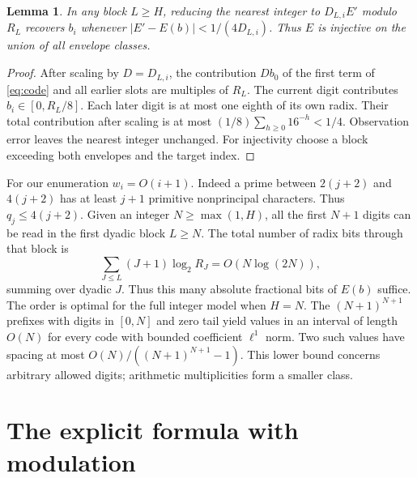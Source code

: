 \documentclass[11pt]{article}
\newtheorem{lemma}[theorem]{Lemma}
\begin{document}
\begin{lemma}\label{l:digits}
In any block $L\ge H$, reducing the nearest integer to $D_{L,i}E'$ modulo $R_L$ recovers $b_i$ whenever $|E'-E(b)|<1/(4D_{L,i})$. Thus $E$ is injective on the union of all envelope classes.
\end{lemma}

\begin{proof}
After scaling by $D=D_{L,i}$, the contribution $D b_0$ of the first term of \eqref{eq:code} and all earlier slots are multiples of $R_L$. The current digit contributes $b_i\in[0,R_L/8]$. Each later digit is at most one eighth of its own radix. Their total contribution after scaling is at most $(1/8)\sum_{h\ge0}16^{-h}<1/4$. Observation error leaves the nearest integer unchanged. For injectivity choose a block exceeding both envelopes and the target index.
\end{proof}

For our enumeration $w_i=O(i+1)$. Indeed a prime between $2(j+2)$ and $4(j+2)$ has at least $j+1$ primitive nonprincipal characters. Thus $q_j\le4(j+2)$. Given an integer $N\ge\max(1,H)$, all the first $N+1$ digits can be read in the first dyadic block $L\ge N$. The total number of radix bits through that block is
\[
 \sum_{J\le L}(J+1)\log_2 R_J=O(N\log(2N)),
\]
summing over dyadic $J$. Thus this many absolute fractional bits of $E(b)$ suffice. The order is optimal for the full integer model when $H=N$. The $(N+1)^{N+1}$ prefixes with digits in $[0,N]$ and zero tail yield values in an interval of length $O(N)$ for every code with bounded coefficient $\ell^1$ norm. Two such values have spacing at most $O(N)/((N+1)^{N+1}-1)$. This lower bound concerns arbitrary allowed digits; arithmetic multiplicities form a smaller class.

\section{The explicit formula with modulation}
\end{document}
